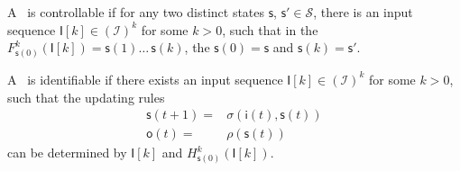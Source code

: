 \begin{definition}
	A \BCN\ is controllable if for any two distinct states $\mathsf{s}$, $\mathsf{s}' \in \mathcal{S}$, there is an input sequence $\mathsf{I}[k]\in(\mathcal{I})^k$ for some $k>0$, such that in the  $F^k_{\mathsf{s}(0)}(\mathsf{I}[k])=\mathsf{s}(1) \ldots\, \mathsf{s}(k)$, the $\mathsf{s}(0)=\mathsf{s}$ and $\mathsf{s}(k)=\mathsf{s}'$.
\end{definition}


\begin{definition}%
	A \BCN\ is identifiable if there exists an input sequence $\mathsf{I}[k]\in(\mathcal{I})^k$ for some $k>0$, such that the updating rules
	\begin{equation*}
    		\begin{split}
		\mathsf{s}(t+1)=&\sigma(\mathsf{i}(t),\mathsf{s}(t))\\
		\mathsf{o}(t)=&\rho(\mathsf{s}(t))
		\end{split}
	\end{equation*}
	can be determined by $\mathsf{I}[k]$ and $H^k_{\mathsf{s}(0)}(\mathsf{I}[k])$.
\end{definition}


